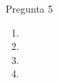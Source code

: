 \documentclass{beamer}
\begin{document}
\begin{frame}{Pregunta 5}
  \justify
\Pregcinco
\vspace{1em}

\begin{enumerate}[label=\textbf{\alph*)}]
  \item \Pregcincoa
  \item \Pregcincob
  \item \Pregcincoc
  \item \Pregcincod
\end{enumerate}

\end{frame}

\end{document}
